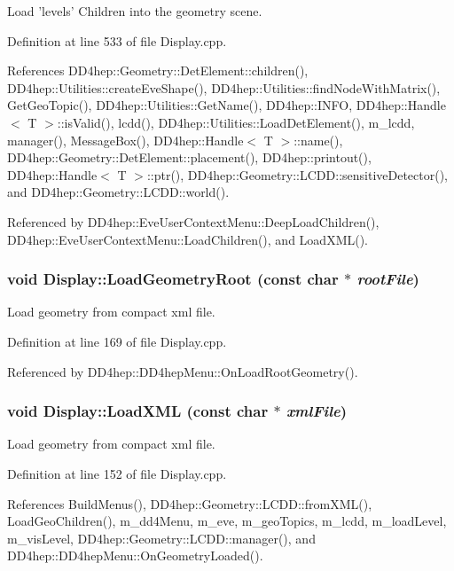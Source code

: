 Load 'levels' Children into the geometry scene. 

Definition at line 533 of file Display.cpp.

References DD4hep::Geometry::DetElement::children(), DD4hep::Utilities::createEveShape(), DD4hep::Utilities::findNodeWithMatrix(), GetGeoTopic(), DD4hep::Utilities::GetName(), DD4hep::INFO, DD4hep::Handle$<$ T $>$::isValid(), lcdd(), DD4hep::Utilities::LoadDetElement(), m\_\-lcdd, manager(), MessageBox(), DD4hep::Handle$<$ T $>$::name(), DD4hep::Geometry::DetElement::placement(), DD4hep::printout(), DD4hep::Handle$<$ T $>$::ptr(), DD4hep::Geometry::LCDD::sensitiveDetector(), and DD4hep::Geometry::LCDD::world().

Referenced by DD4hep::EveUserContextMenu::DeepLoadChildren(), DD4hep::EveUserContextMenu::LoadChildren(), and LoadXML().\hypertarget{class_d_d4hep_1_1_display_a6f599f1026155bd68b860fa4f9904d62}{
\subsubsection[{LoadGeometryRoot}]{\setlength{\rightskip}{0pt plus 5cm}void Display::LoadGeometryRoot (const char $\ast$ {\em rootFile})}}
\label{class_d_d4hep_1_1_display_a6f599f1026155bd68b860fa4f9904d62}


Load geometry from compact xml file. 

Definition at line 169 of file Display.cpp.

Referenced by DD4hep::DD4hepMenu::OnLoadRootGeometry().\hypertarget{class_d_d4hep_1_1_display_ade2c0fff0fb152ea4605c30c5516c319}{
\subsubsection[{LoadXML}]{\setlength{\rightskip}{0pt plus 5cm}void Display::LoadXML (const char $\ast$ {\em xmlFile})}}
\label{class_d_d4hep_1_1_display_ade2c0fff0fb152ea4605c30c5516c319}


Load geometry from compact xml file. 

Definition at line 152 of file Display.cpp.

References BuildMenus(), DD4hep::Geometry::LCDD::fromXML(), LoadGeoChildren(), m\_\-dd4Menu, m\_\-eve, m\_\-geoTopics, m\_\-lcdd, m\_\-loadLevel, m\_\-visLevel, DD4hep::Geometry::LCDD::manager(), and DD4hep::DD4hepMenu::OnGeometryLoaded().


